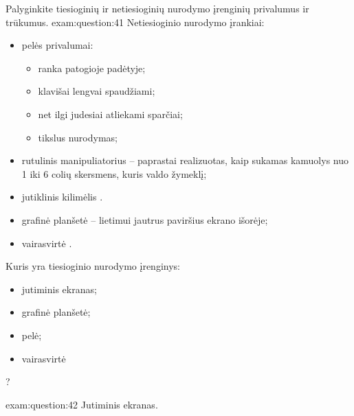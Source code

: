 \begin{question}{%
  Palyginkite tiesioginių ir netiesioginių nurodymo įrenginių privalumus
  ir trūkumus.
  }{exam:question:41}
  Netiesioginio nurodymo įrankiai:
  \begin{itemize}
    \item pelės privalumai\cite[33]{skaidres-16}:
      \begin{itemize}
        \item ranka patogioje padėtyje;
        \item klavišai lengvai spaudžiami;
        \item net ilgi judesiai atliekami sparčiai;
        \item tikslus nurodymas;
      \end{itemize}
    \item rutulinis manipuliatorius\cite[34]{skaidres-16} 
      – paprastai realizuotas, kaip sukamas kamuolys nuo 1 iki 6
      colių skersmens, kuris valdo žymeklį;
    \item jutiklinis kilimėlis\cite[34]{skaidres-16} .
    \item grafinė planšetė  – lietimui jautrus
      paviršius ekrano išorėje;
    \item vairasvirtė .
  \end{itemize}
\end{question}

\begin{question}{%
  Kuris yra tiesioginio nurodymo įrenginys:
  \begin{itemize}
    \item jutiminis ekranas;
    \item grafinė planšetė;
    \item pelė;
    \item vairasvirtė
  \end{itemize}
  ?
  }{exam:question:42}
  Jutiminis ekranas.
\end{question}

